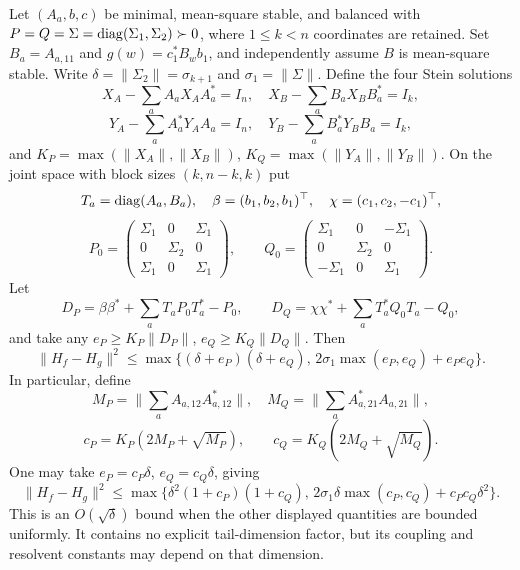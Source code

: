 \begin{theorem}
\label{I:U:thm:reference-truncation}
Let $(A_a,b,c)$ be minimal, mean-square stable, and balanced with
$P=Q=\Sigma=\operatorname{diag}(\Sigma_1,\Sigma_2)\succ0$, where $1\le k<n$
coordinates are retained. Set $B_a=A_{a,11}$ and
$g(w)=c_1^*B_wb_1$, and independently assume $B$ is mean-square
stable. Write $\delta=\|\Sigma_2\|=\sigma_{k+1}$ and
$\sigma_1=\|\Sigma\|$. Define the four Stein solutions
\[
 X_A-\sum_aA_aX_AA_a^*=I_n,\quad
 X_B-\sum_aB_aX_BB_a^*=I_k,
\]
\[
 Y_A-\sum_aA_a^*Y_AA_a=I_n,\quad
 Y_B-\sum_aB_a^*Y_BB_a=I_k,
\]
and $K_P=\max(\|X_A\|,\|X_B\|)$,
$K_Q=\max(\|Y_A\|,\|Y_B\|)$.
On the joint space with block sizes $(k,n-k,k)$ put
\[
 T_a=\operatorname{diag}(A_a,B_a),\quad \beta=(b_1,b_2,b_1)^\top,
 \quad\chi=(c_1,c_2,-c_1)^\top,
\]
\[
 P_0=\begin{pmatrix}\Sigma_1&0&\Sigma_1\\0&\Sigma_2&0\\
 \Sigma_1&0&\Sigma_1\end{pmatrix},\qquad
 Q_0=\begin{pmatrix}\Sigma_1&0&-\Sigma_1\\0&\Sigma_2&0\\
 -\Sigma_1&0&\Sigma_1\end{pmatrix}.
\]
Let
\[
 D_P=\beta\beta^*+\sum_aT_aP_0T_a^*-P_0,\qquad
 D_Q=\chi\chi^*+\sum_aT_a^*Q_0T_a-Q_0,
\]
and take any $e_P\ge K_P\|D_P\|$, $e_Q\ge K_Q\|D_Q\|$.
Then
\begin{equation}
 \|H_f-H_g\|^2\le
 \max\{(\delta+e_P)(\delta+e_Q),\,
                    2\sigma_1\max(e_P,e_Q)+e_Pe_Q\}.
 \label{I:U:eq:reference-truncation}
\end{equation}
In particular, define
\[
 M_P=\Big\|\sum_aA_{a,12}A_{a,12}^*\Big\|,\quad
 M_Q=\Big\|\sum_aA_{a,21}^*A_{a,21}\Big\|,
\]
\[
 c_P=K_P(2M_P+\sqrt{M_P}),\qquad
 c_Q=K_Q(2M_Q+\sqrt{M_Q}).
\]
One may take $e_P=c_P\delta$, $e_Q=c_Q\delta$, giving
\begin{equation}
 \|H_f-H_g\|^2\le
 \max\{\delta^2(1+c_P)(1+c_Q),\,
             2\sigma_1\delta\max(c_P,c_Q)+c_Pc_Q\delta^2\}.
 \label{I:U:eq:reference-square-root}
\end{equation}
This is an $O(\sqrt\delta)$ bound when the other displayed quantities
are bounded uniformly. It contains no explicit tail-dimension factor,
but its coupling and resolvent constants may depend on that dimension.
\end{theorem}


